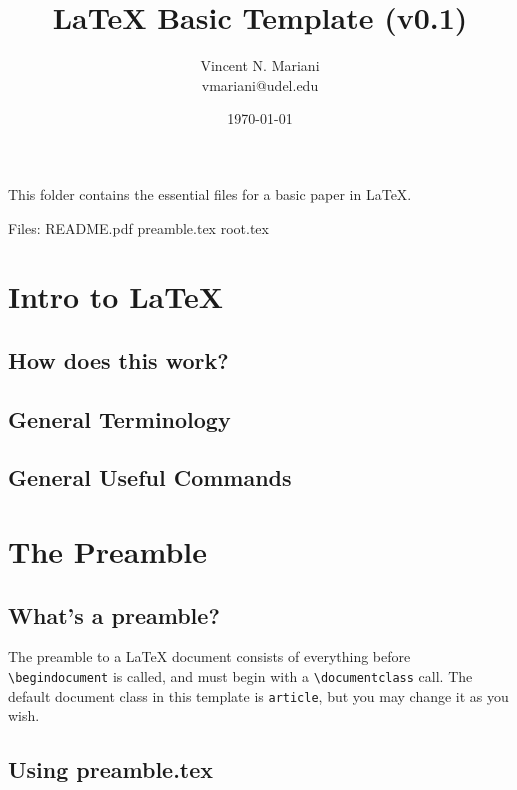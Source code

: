 \documentclass{article}
\author{Vincent N. Mariani\\vmariani@udel.edu}
\date{\today}
\title{LaTeX Basic Template (v0.1)}
\begin{document}
    \maketitle%

This folder contains the essential files for a basic paper in \LaTeX. 

\begin{outline}
    \0 Files:
        \1 README.pdf
        \1 preamble.tex
        \1 root.tex
\end{outline}


\tableofcontents

\section{Intro to \LaTeX}

\subsection{How does this work?}

\subsection{General Terminology}

\subsection{General Useful Commands}

\section{The Preamble}



\subsection{What's a preamble?}

The preamble to a LaTeX document consists of everything before \texttt{\textbackslash begin{document}} is called, and must begin with a \texttt{\textbackslash documentclass{}} call. The default document class in this template is \texttt{article}, but you may change it as you wish.

\subsection{Using preamble.tex}
\end{document}
